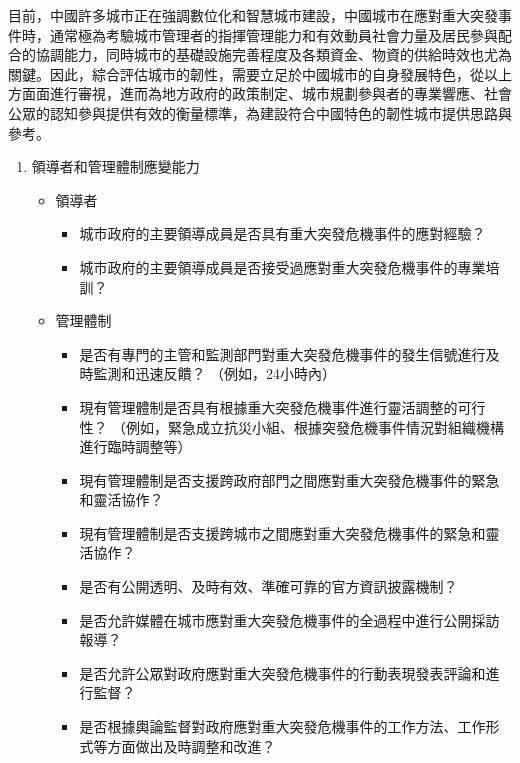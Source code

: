 \documentclass[a4paper,12pt]{article}
\begin{document}
\begin{enumerate}
\begin{enumerate}
目前，中國許多城市正在強調數位化和智慧城市建設，中國城市在應對重大突發事件時，通常極為考驗城市管理者的指揮管理能力和有效動員社會力量及居民參與配合的協調能力，同時城市的基礎設施完善程度及各類資金、物資的供給時效也尤為關鍵。因此，綜合評估城市的韌性，需要立足於中國城市的自身發展特色，從以上方面面進行審視，進而為地方政府的政策制定、城市規劃參與者的專業響應、社會公眾的認知參與提供有效的衡量標準，為建設符合中國特色的韌性城市提供思路與參考。\\
\begin{enumerate}
\item 領導者和管理體制應變能力
\label{sec:orgcc99675}
\begin{itemize}
\item 領導者
\label{sec:orgd635c39}
\begin{itemize}
\item 城市政府的主要領導成員是否具有重大突發危機事件的應對經驗？\\
\item 城市政府的主要領導成員是否接受過應對重大突發危機事件的專業培訓？\\
\end{itemize}
\item 管理體制
\label{sec:org9649796}
\begin{itemize}
\item 是否有專門的主管和監測部門對重大突發危機事件的發生信號進行及時監測和迅速反饋？  （例如，24小時內）\\
\item 現有管理體制是否具有根據重大突發危機事件進行靈活調整的可行性？  （例如，緊急成立抗災小組、根據突發危機事件情況對組織機構進行臨時調整等）\\
\item 現有管理體制是否支援跨政府部門之間應對重大突發危機事件的緊急和靈活協作？\\
\item 現有管理體制是否支援跨城市之間應對重大突發危機事件的緊急和靈活協作？\\
\item 是否有公開透明、及時有效、準確可靠的官方資訊披露機制？\\
\item 是否允許媒體在城市應對重大突發危機事件的全過程中進行公開採訪報導？\\
\item 是否允許公眾對政府應對重大突發危機事件的行動表現發表評論和進行監督？\\
\item 是否根據輿論監督對政府應對重大突發危機事件的工作方法、工作形式等方面做出及時調整和改進？\\

\end{itemize}
\end{itemize}
\end{enumerate}
\end{enumerate}
\end{enumerate}
\end{document}
